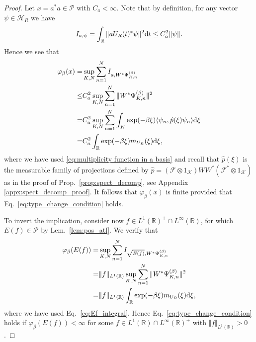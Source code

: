 \documentclass[sn-mathphys-num]{sn-jnl}%
\newcommand{\RR}{\mathbb{R}}
\newcommand{\HH}{\mathcal{H}}
\newcommand{\KK}{\mathcal{K}}
\newcommand{\diff}{\textup{d}}
\numberwithin{equation}{section}
\theoremstyle{thmstyleone}%
\theoremstyle{thmstyletwo}%
\theoremstyle{thmstylethree}%
\begin{document}
\begin{proof}
    Let $x=a^*a\in\mathcal{P}$ with $C_a<\infty$. Note that by definition, for any vector $\psi\in\HH_R$ we have
    \begin{equation}
        I_{a,\psi}=\int_\RR\Vert aU_R(t)^*\psi\Vert^2\diff t\leq C_a^2\Vert\psi\Vert.
    \end{equation}
    Hence we see that
    \begin{align}
        \varphi_\beta(x)=&\sup_{K,N}\sum_{n=1}^N I_{a,W^*\Psi_{K,n}^{(\beta)}}\nonumber\\
        \leq&C_a^2\sup_{K,N}\sum_{n=1}^N \Vert W^*\Psi_{K,n}^{(\beta)}\Vert^2\nonumber\\
        =&C_a^2\sup_{K,N}\sum_{n=1}^N \int_K \exp(-\beta\xi)\langle\psi_n, \hat{p}(\xi)\psi_n\rangle\diff\xi\nonumber\\
        =&C_a^2\int_\RR \exp(-\beta\xi)m_{U_R}(\xi)\diff\xi,
    \end{align}
    where we have used \eqref{eq:multiplicity function in a basis} and recall that $\hat{p}(\xi)$ is the measurable family of projections defined by $\hat{p}=(\mathcal{F}\otimes 1_{\KK})WW^*(\mathcal{F}^*\otimes 1_{\KK})$ as in the proof of Prop.\ \ref{prop:spect_decomp}, see Appendix \ref{appx:spect_decomp_proof}. It follows that $\varphi_\beta(x)$ is finite provided that Eq.\ \eqref{eq:type_change_condition} holds. 

    To invert the implication, consider now $f\in L^1(\RR)^+\cap L^\infty(\RR)$, for which $E(f)\in\mathcal{P}$ by Lem.\ \ref{lem:pos_atl}. We verify that
    \begin{align}
        \varphi_\beta(E(f))=&\sup_{K,N}\sum_{n=1}^N I_{\sqrt{E(f)},W^*\Psi_{K,n}^{(\beta)}}\nonumber\\
        =&\Vert f\Vert_{L^1(\RR)}\sup_{K,N}\sum_{n=1}^N \Vert W^*\Psi_{K,n}^{(\beta)}\Vert^2\nonumber\\
        =&\Vert f\Vert_{L^1(\RR)}\int_\RR \exp(-\beta\xi)m_{U_R}(\xi)\diff\xi,
    \end{align}
    where we have used Eq.\ \eqref{eq:Ef_integral}. Hence Eq.\ \eqref{eq:type_change_condition} holds if $\varphi_\beta(E(f))<\infty$ for some $f\in L^1(\RR)\cap L^\infty(\RR)^+$ with $\Vert f\Vert_{L^1(\RR)}>0$.
\end{proof}
\end{document}
